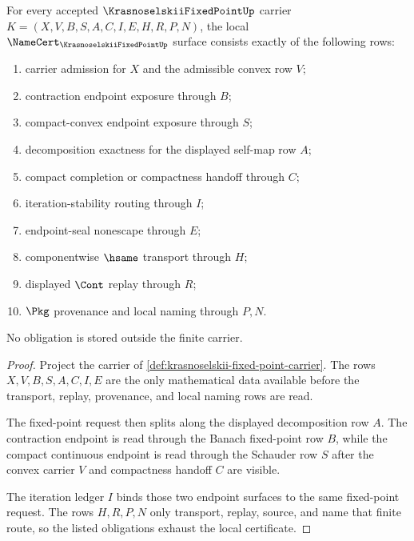 \begin{theorem}
\label{thm:krasnoselskii-fixed-point-namecert-obligations}
For every accepted $\KrasnoselskiiFixedPointUp$ carrier
$K=(X,V,B,S,A,C,I,E,H,R,P,N)$, the local
$\NameCert_{\KrasnoselskiiFixedPointUp}$ surface consists exactly of the
following rows:
\begin{enumerate}
\item carrier admission for $X$ and the admissible convex row $V$;
\item contraction endpoint exposure through $B$;
\item compact-convex endpoint exposure through $S$;
\item decomposition exactness for the displayed self-map row $A$;
\item compact completion or compactness handoff through $C$;
\item iteration-stability routing through $I$;
\item endpoint-seal nonescape through $E$;
\item componentwise $\hsame$ transport through $H$;
\item displayed $\Cont$ replay through $R$;
\item $\Pkg$ provenance and local naming through $P,N$.
\end{enumerate}
No obligation is stored outside the finite carrier.
\end{theorem}
\begin{proof}
Project the carrier of \autoref{def:krasnoselskii-fixed-point-carrier}. The
rows $X,V,B,S,A,C,I,E$ are the only mathematical data available before the
transport, replay, provenance, and local naming rows are read.

The fixed-point request then splits along the displayed decomposition row $A$.
The contraction endpoint is read through the Banach fixed-point row $B$, while
the compact continuous endpoint is read through the Schauder row $S$ after the
convex carrier $V$ and compactness handoff $C$ are visible.

The iteration ledger $I$ binds those two endpoint surfaces to the same
fixed-point request. The rows $H,R,P,N$ only transport, replay, source, and name
that finite route, so the listed obligations exhaust the local certificate.
\end{proof}

